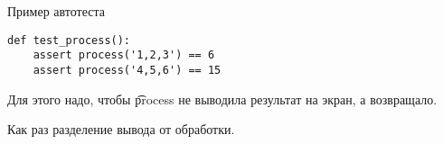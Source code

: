\begin{frame}[t,fragile]{Пример автотеста}
\begin{verbatim}
def test_process():
    assert process('1,2,3') == 6
    assert process('4,5,6') == 15
\end{verbatim}

	Для этого надо, чтобы \t{process} не выводила результат на экран,
	а возвращало.

	Как раз разделение вывода от обработки.
\end{frame}
